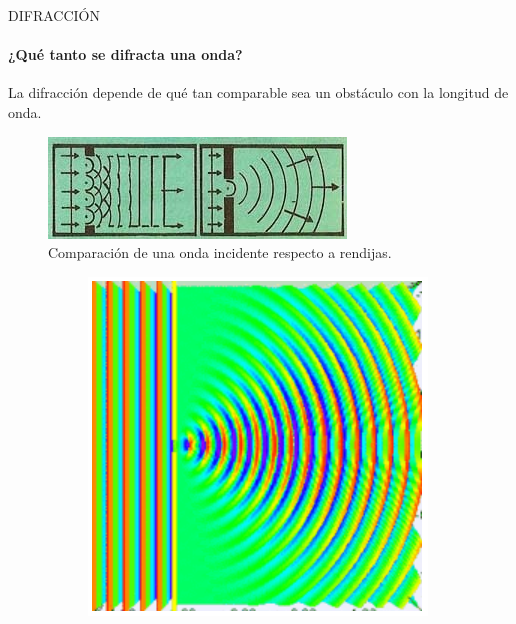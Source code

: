 \begin{frame}{DIFRACCIÓN}
    \framesubtitle{¿Qué tanto se difracta una onda?}
    La difracción depende de qué tan comparable sea un obstáculo con la longitud de onda.
    \begin{figure}
        \includegraphics[scale=0.5]{david/wavelength.jpg}
        \caption{Comparación de una onda incidente respecto a rendijas.}
    \end{figure}

    \begin{figure}
        \centering
        \begin{subfigure}[H]{0.25\textwidth}
            \includegraphics[width=\linewidth]{david/narrow.PNG}
        \end{subfigure}
        \hspace{2mm}
        \begin{subfigure}[H]{0.25\textwidth}

\end{subfigure}
\end{figure}
\end{frame}
